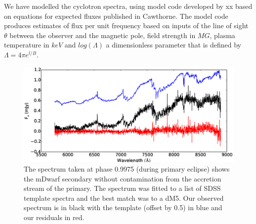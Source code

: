 \documentclass[a4paper,fleqn,usenatbib]{mnras}
\begin{document}
We have modelled the cyclotron spectra, using model code developed by xx based on equations for expected fluxes published in Cawthorne. The model code produces estimates of flux per unit frequency based on inputs of the line of sight $\theta$ between the observer and the magnetic pole, field strength in $MG$, plasma temperature in $keV$ and $log(\Lambda)$ a dimensionless parameter that is defined by $\Lambda = 4 \pi e^{l / B}$.

\begin{figure}
\centering
\includegraphics[width=\textwidth]{images/modelfit.eps}
\caption[Caption for spectrum]{The spectrum taken at phase 0.9975 (during primary eclipse) shows the mDwarf secondary without contamination from the accretion stream of the primary. The spectrum was fitted to a list of SDSS template spectra and the best match was to a dM5. Our observed spectrum is in black with the template (offset by 0.5) in blue and our residuals in red. }
\label{fig:sloanfit}
\end{figure}
\end{document}
